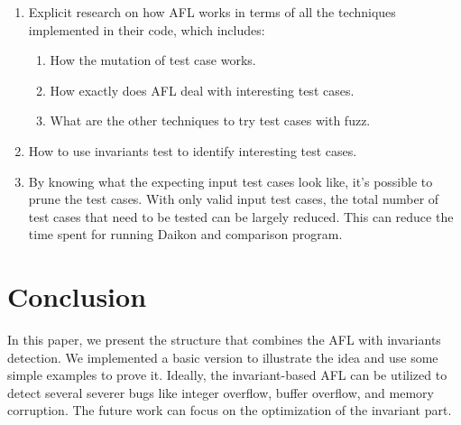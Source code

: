 \documentclass[sigplan,10pt,review = false]{acmart}\settopmatter{printfolios=true,printccs=false,printacmref=false}
\begin{document}
\begin{enumerate}
\item Explicit research on how AFL works in terms of all the techniques implemented in their code, which includes:
\begin{enumerate}
\item How the mutation of test case works.
\item How exactly does AFL deal with interesting test cases.
\item What are the other techniques to try test cases with fuzz.
\end{enumerate}
\item How to use invariants test to identify interesting test cases.
\item By knowing what the expecting input test cases look like, it's possible to prune the test cases. With only valid input test cases, the total number of test cases that need to be tested can be largely reduced. This can reduce the time spent for running Daikon and comparison program.   
\end{enumerate}

\section{Conclusion}
In this paper, we present the structure that combines the AFL with invariants detection. We implemented a basic version to illustrate the idea and use some simple examples to prove it. Ideally, the invariant-based AFL can be utilized to detect several severer bugs like integer overflow, buffer overflow, and memory corruption. The future work can focus on the optimization of the invariant part. 





\end{document}
